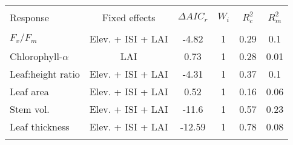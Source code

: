 
\begin{table}[!htbp] \centering 
  \caption{} 
  \label{best_mod_multi_output} 
\begin{tabular}{@{\extracolsep{5pt}} lcS[table-format=3.2]S[table-format=3.2]S[table-format=3.2]S[table-format=3.2]} 
\\[-1.8ex]\hline 
\hline \\[-1.8ex] 
{Response} & {Fixed effects} & {$\Delta{}AIC_r$} & {$W_i$} & {$R^2_c$} & {$R^2_m$} \\
\hline \\[-1.8ex] 
$F_v/F_m$ & Elev. + ISI + LAI & -4.82 & 1 & 0.29 & 0.1 \\ 
Chlorophyll-$\alpha$ & LAI & 0.73 & 1 & 0.28 & 0.01 \\ 
Leaf:height ratio & Elev. + ISI + LAI & -4.31 & 1 & 0.37 & 0.1 \\ 
Leaf area & Elev. + ISI + LAI & 0.52 & 1 & 0.16 & 0.06 \\ 
Stem vol. & Elev. + ISI + LAI & -11.6 & 1 & 0.57 & 0.23 \\ 
Leaf thickness & Elev. + ISI + LAI & -12.59 & 1 & 0.78 & 0.08 \\ 
\hline \\[-1.8ex] 
\end{tabular} 
\end{table} 
